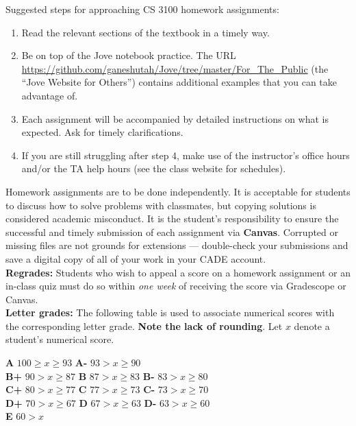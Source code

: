 \documentclass[12pt]{article}
\newcommand{\para}[1]{{\vspace{4pt}\noindent\bf{#1:}}}
\newcommand{\denselist}{\vspace{-5pt} \itemsep -2pt\parsep=-1pt\partopsep -2pt}
\begin{document}
\noindent Suggested steps for approaching CS 3100 homework assignments:

\begin{enumerate}\denselist
\item Read the relevant sections of the textbook in a timely way.
\item Be on top of the Jove notebook practice.
  The URL
  \url{https://github.com/ganeshutah/Jove/tree/master/For_The_Public}
  (the ``Jove Website for Others'')
  contains additional examples that you can take advantage of.
\item Each assignment will be accompanied by detailed instructions
  on what is expected. Ask for timely clarifications.
\item If you are still struggling after step 4, make use of the
  instructor's office hours and/or the TA help hours
  (see the class website for schedules).
\end{enumerate}

Homework assignments are to be done independently.
It is acceptable for students to discuss how to solve problems
with classmates, but copying solutions is considered academic misconduct.
It is the student’s responsibility to ensure the successful and timely
submission of each assignment via 
\textbf{Canvas}.
%
Corrupted or missing files are not grounds for extensions —
double-check your submissions and save a digital copy of all
of your work in your CADE account.\\

\para{Regrades} 
Students who wish to appeal a score on a homework assignment or an in-class quiz must do so within \textit{one week} of receiving the score via
Gradescope or Canvas.\\

\para{Letter grades} 
The following table is used to associate numerical scores with the corresponding letter grade. \textbf{Note the lack of rounding}. 
Let $x$ denote a student's numerical score. 

\noindent
{\bf A} $100 \geq x \geq 93$ {\bf A-} $93 > x \geq 90$ \\	
{\bf B+} $90 > x \geq 87$ {\bf B} $87 > x \geq 83$ {\bf B-} $83 > x \geq 80$ \\
{\bf C+} $80 > x \geq 77$ {\bf C} $77 > x \geq 73$ {\bf C-} $73> x \geq 70$ \\
{\bf D+} $70 > x \geq 67$ {\bf D} $67 > x \geq 63$ {\bf D-} $63 > x \geq 60$ \\
{\bf E} $60 > x$\\
\end{document}
